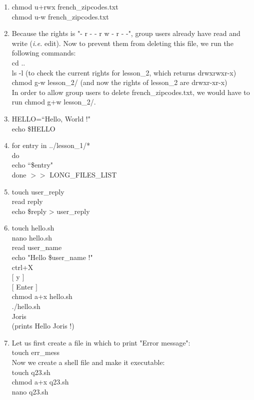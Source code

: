 \documentclass{article}
\begin{document}
\begin{enumerate}
    \item chmod u+rwx french\_zipcodes.txt \\
    chmod u-w french\_zipcodes.txt
    \item Because the rights is "- r - - r w - r - -", group users already have read and write (\textit{i.e.} edit). Now to prevent them from deleting this file, we run the following commands:\\
    cd .. \\
    ls -l (to check the current rights for lesson\_2, which returns drwxrwxr-x) \\
    chmod g-w lesson\_2/ (and now the rights of lesson\_2 are drwxr-xr-x) \\
    In order to allow group users to delete french\_zipcodes.txt, we would have to run chmod g+w lesson\_2/.
    \item HELLO=``Hello, World !" \\
    echo \$HELLO
    \item for entry in ../lesson\_1/* \\
    do \\
    \text{ } echo ``\$entry" \\
    done \(>>\) LONG\_FILES\_LIST
    \item touch user\_reply \\
    read reply \\
    echo \$reply > user\_reply
    \item touch hello.sh \\
    nano hello.sh \\
    read user\_name \\
    echo "Hello \$user\_name !" \\
    ctrl+X \\
    \([\) y \(]\) \\
    \([\) Enter \(]\) \\
    chmod a+x hello.sh \\
    ./hello.sh \\
    Joris \\
    (prints Hello Joris !)
    \item Let us first create a file in which to print "Error message": \\
    touch err\_mess \\
    Now we create a shell file and make it executable: \\
    touch q23.sh \\
    chmod a+x q23.sh \\
    nano q23.sh \\

\end{enumerate}
\end{document}
